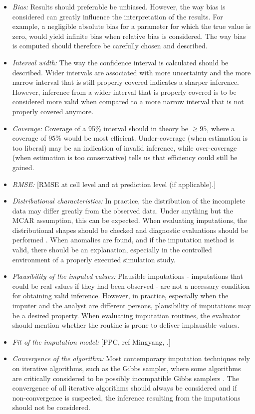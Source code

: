 \documentclass[bimj,fleqn]{w-art}
\begin{document}
\begin{itemize}
  \item \emph{Bias:} Results should preferable be unbiased. However, the way bias is considered can greatly influence the interpretation of the results. For example, a negligible absolute bias for a parameter for which the true value is zero, would yield infinite bias when relative bias is considered. The way bias is computed should therefore be carefully chosen and described. 
  \item \emph{Interval width:} The way the confidence interval is calculated should be described. Wider intervals are associated with more uncertainty and the more narrow interval that is still properly covered indicates a sharper inference. However, inference from a wider interval that is properly covered is to be considered more valid when compared to a more narrow interval that is not properly covered anymore. 
  \item \emph{Coverage:} Coverage of a 95\% interval should in theory be $\geq 95$, where a coverage of 95\% would be most efficient. Under-coverage (when estimation is too liberal) may be an indication of invalid inference, while over-coverage (when estimation is too conservative) tells us that efficiency could still be gained. 
  \item \emph{RMSE:} [RMSE at cell level and at prediction level (if applicable).]
  \item \emph{Distributional characteristics:} In practice, the distribution of the incomplete data may differ greatly from the observed data. Under anything but the MCAR assumption, this can be expected. When evaluating imputations, the distributional shapes should be checked and diagnostic evaluations should be performed \citep[see][for an detailed overview of diagnostic evaluation for multivariate imputations]{abayomi2008diagnostics}. When anomalies are found, and if the imputation method is valid, there should be an explanation, especially in the controlled environment of a properly executed simulation study. 
  \item \emph{Plausibility of the imputed values:} Plausible imputations - imputations that could be real values if they had been observed - are not a necessary condition for obtaining valid inference. However, in practice, especially when the imputer and the analyst are different persons, plausibility of imputations may be a desired property. When evaluating imputation routines, the evaluator should mention whether the routine is prone to deliver implausible values. 
  \item \emph{Fit of the imputation model:} [PPC, ref Mingyang, \citep{nguy17, zhao22}.]
  \item \emph{Convergence of the algorithm:} Most contemporary imputation techniques rely on iterative algorithms, such as the Gibbs sampler, where some algorithms are critically considered to be possibly incompatible Gibbs samplers \citep[PIGS,][]{li2012imputing}. The convergence of all iterative algorithms should always be considered and if non-convergence is suspected, the inference resulting from the imputations should not be considered.  
  \end{itemize}
\end{document}
